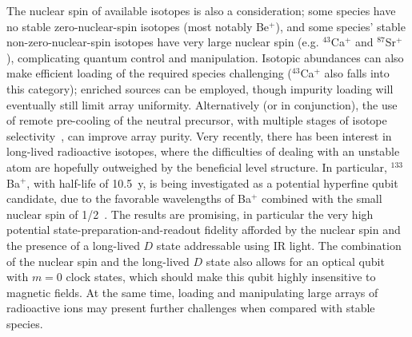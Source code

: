 \documentclass[%
12pt,
 amsmath,amssymb,
]{revtex4-2}
\begin{document}
The nuclear spin of available isotopes is also a consideration; some species have no stable zero-nuclear-spin isotopes (most notably Be$^{+}$), and some species' stable non-zero-nuclear-spin isotopes have very large nuclear spin (e.g. $^{43}$Ca$^{+}$ and $^{87}$Sr$^{+}$), complicating quantum control and manipulation.  Isotopic abundances can also make efficient loading of the required species challenging ($^{43}$Ca$^{+}$ also falls into this category); enriched sources can be employed, though impurity loading will eventually still limit array uniformity.  Alternatively (or in conjunction), the use of remote pre-cooling of the neutral precursor, with multiple stages of isotope selectivity~\cite{sage2012loading,BruzewiczArrayLoading2016}, can improve array purity.  Very recently, there has been interest in long-lived radioactive isotopes, where the difficulties of dealing with an unstable atom are hopefully outweighed by the beneficial level structure.  In particular, $^{133}$Ba$^{+}$, with half-life of 10.5~y, is being investigated as a potential hyperfine qubit candidate, due to the favorable wavelengths of Ba$^{+}$ combined with the small nuclear spin of 1/2~\cite{PhysRevLett.119.100501}.  The results are promising, in particular the very high potential state-preparation-and-readout fidelity afforded by the nuclear spin and the presence of a long-lived $D$ state addressable using IR light. The combination of the nuclear spin and the long-lived $D$ state also allows for an optical qubit with $m=0$ clock states, which should make this qubit highly insensitive to magnetic fields.  At the same time, loading and manipulating large arrays of radioactive ions may present further challenges when compared with stable species.
\end{document}
